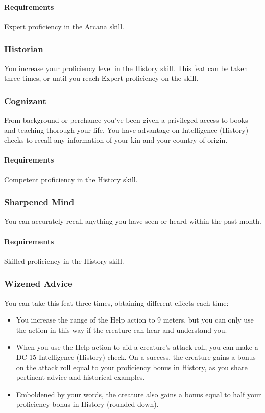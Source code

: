     \paragraph{Requirements} Expert proficiency in the Arcana skill.
\subsubsection{Historian} \label{feat::historian}
    You increase your proficiency level in the History skill.
    This feat can be taken three times, or until you reach Expert proficiency on the skill.
\subsubsection{Cognizant} \label{feat::cognizant}
    From background or perchance you've been given a privileged access to books and teaching thorough your life.
    You have advantage on Intelligence (History) checks to recall any information of your kin and your country of origin.
    \paragraph{Requirements} Competent proficiency in the History skill.
\subsubsection{Sharpened Mind} \label{feat::sharpenedmind}
    You can accurately recall anything you have seen or heard within the past month.
    \paragraph{Requirements} Skilled proficiency in the History skill.
\subsubsection{Wizened Advice} \label{feat::wizenedadvice}
    You can take this feat three times, obtaining different effects each time:
    \begin{itemize}
        \item You increase the range of the Help action to 9 meters, but you can only use the action in this way if the creature can hear and understand you.
        \item When you use the Help action to aid a creature's attack roll, you can make a DC 15 Intelligence (History) check.
        On a success, the creature gains a bonus on the attack roll equal to your proficiency bonus in History, as you share pertinent advice and historical examples.
        \item Emboldened by your words, the creature also gains a bonus equal to half your proficiency bonus in History (rounded down).
    \end{itemize}
